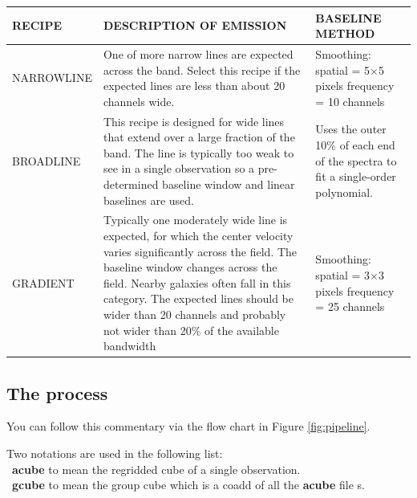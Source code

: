 \documentclass[twoside,11pt]{article}
\newcommand{\xlabel}[1]{}
\renewcommand{\_}{\texttt{\symbol{95}}}
\begin{document}
\begin{table}[h!]
\begin{tabular}{p{2.9cm}|p{7.3cm}|p{4.5cm}}
\hline
\textbf{RECIPE} & \textbf{DESCRIPTION OF EMISSION} & \textbf{BASELINE METHOD} \\
\hline
NARROWLINE & One of more narrow lines are expected across the band. Select this recipe if the expected lines are less than about 20 channels wide.& Smoothing: \newline spatial = 5$\times$5 pixels \newline frequency = 10 channels\\
\hline
BROADLINE &This recipe is designed for wide lines that extend over a large fraction of the band. The line is typically too weak to see in a single observation so a pre-determined baseline window and linear baselines are used.  &Uses the outer 10\% of each end of the spectra to fit a single-order polynomial.  \\
\hline
GRADIENT &Typically one moderately wide line is expected, for which the center velocity varies significantly across the field. The baseline window changes across the field. Nearby galaxies often fall in this category. The expected lines should be wider than 20 channels and probably not wider than 20\% of the available bandwidth  & Smoothing: \newline spatial = 3$\times$3 pixels  \newline frequency = 25 channels\\
\hline
\end{tabular}
\end{table}

\subsection{\xlabel{recipes}The process}
You can follow this commentary via the flow chart in Figure \ref{fig:pipeline}.

Two notations are used in the following list:\\ 
\textbullet\ \textbf{a\_cube} to mean the regridded cube of a single observation. \\
\textbullet\ \textbf{g\_cube} to mean the group cube which is a coadd of all the \textbf{a\_cube} file s.
\end{document}
